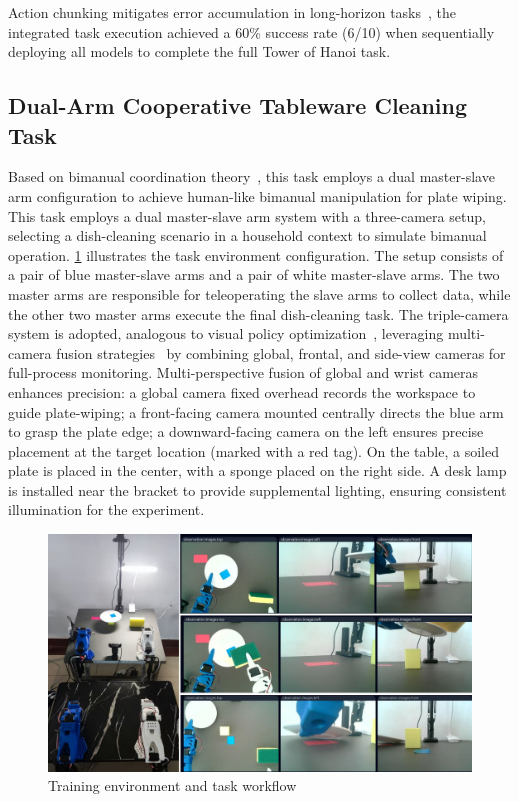 \documentclass[runningheads]{llncs}
\begin{document}
Action chunking mitigates error accumulation in long-horizon tasks~\cite{ref10}, the integrated task execution achieved a 60\% success rate (6/10) when sequentially deploying all models to complete the full Tower of Hanoi task.

\subsection{Dual-Arm Cooperative Tableware Cleaning Task}
Based on bimanual coordination theory~\cite{ref11}, this task employs a dual master-slave arm configuration to achieve human-like bimanual manipulation for plate wiping. This task employs a dual master-slave arm system with a three-camera setup, selecting a dish-cleaning scenario in a household context to simulate bimanual operation. \cref{fig9} illustrates the task environment configuration. The setup consists of a pair of blue master-slave arms and a pair of white master-slave arms. The two master arms are responsible for teleoperating the slave arms to collect data, while the other two master arms execute the final dish-cleaning task. The triple-camera system is adopted, analogous to visual policy optimization~\cite{ref12}, leveraging multi-camera fusion strategies~\cite{ref13} by combining global, frontal, and side-view cameras for full-process monitoring. Multi-perspective fusion of global and wrist cameras enhances precision: a global camera fixed overhead records the workspace to guide plate-wiping; a front-facing camera mounted centrally directs the blue arm to grasp the plate edge; a downward-facing camera on the left ensures precise placement at the target location (marked with a red tag). On the table, a soiled plate is placed in the center, with a sponge placed on the right side. A desk lamp is installed near the bracket to provide supplemental lighting, ensuring consistent illumination for the experiment.

\begin{figure}
\centering
\includegraphics[width=\textwidth]{fig9.pdf}
\caption{ Training environment and task workflow} \label{fig9}
\end{figure}
\end{document}
